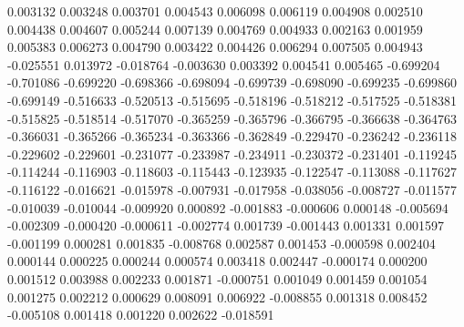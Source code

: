 0.003132
0.003248
0.003701
0.004543
0.006098
0.006119
0.004908
0.002510
0.004438
0.004607
0.005244
0.007139
0.004769
0.004933
0.002163
0.001959
0.005383
0.006273
0.004790
0.003422
0.004426
0.006294
0.007505
0.004943
-0.025551
0.013972
-0.018764
-0.003630
0.003392
0.004541
0.005465
-0.699204
-0.701086
-0.699220
-0.698366
-0.698094
-0.699739
-0.698090
-0.699235
-0.699860
-0.699149
-0.516633
-0.520513
-0.515695
-0.518196
-0.518212
-0.517525
-0.518381
-0.515825
-0.518514
-0.517070
-0.365259
-0.365796
-0.366795
-0.366638
-0.364763
-0.366031
-0.365266
-0.365234
-0.363366
-0.362849
-0.229470
-0.236242
-0.236118
-0.229602
-0.229601
-0.231077
-0.233987
-0.234911
-0.230372
-0.231401
-0.119245
-0.114244
-0.116903
-0.118603
-0.115443
-0.123935
-0.122547
-0.113088
-0.117627
-0.116122
-0.016621
-0.015978
-0.007931
-0.017958
-0.038056
-0.008727
-0.011577
-0.010039
-0.010044
-0.009920
0.000892
-0.001883
-0.000606
0.000148
-0.005694
-0.002309
-0.000420
-0.000611
-0.002774
0.001739
-0.001443
0.001331
0.001597
-0.001199
0.000281
0.001835
-0.008768
0.002587
0.001453
-0.000598
0.002404
0.000144
0.000225
0.000244
0.000574
0.003418
0.002447
-0.000174
0.000200
0.001512
0.003988
0.002233
0.001871
-0.000751
0.001049
0.001459
0.001054
0.001275
0.002212
0.000629
0.008091
0.006922
-0.008855
0.001318
0.008452
-0.005108
0.001418
0.001220
0.002622
-0.018591
